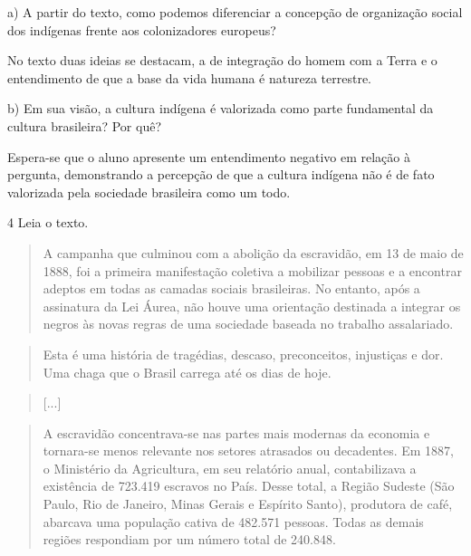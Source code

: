
a) A partir do texto, como podemos diferenciar a concepção de
organização social dos indígenas frente aos colonizadores europeus?

No texto duas ideias se destacam, a de integração do homem com a Terra e
o entendimento de que a base da vida humana é natureza terrestre.

b) Em sua visão, a cultura indígena é valorizada como parte fundamental
da cultura brasileira? Por quê?

Espera-se que o aluno apresente um entendimento negativo em relação à
pergunta, demonstrando a percepção de que a cultura indígena não é de
fato valorizada pela sociedade brasileira como um todo.

\num{4} Leia o texto.

\begin{quote}
A campanha que culminou com a abolição da escravidão, em 13 de maio de
1888, foi a primeira manifestação coletiva a mobilizar pessoas e a
encontrar adeptos em todas as camadas sociais brasileiras. No entanto,
após a assinatura da Lei Áurea, não houve uma orientação destinada a
integrar os negros às novas regras de uma sociedade baseada no trabalho
assalariado.
\end{quote}

\begin{quote}
Esta é uma história de tragédias, descaso, preconceitos, injustiças e
dor. Uma chaga que o Brasil carrega até os dias de hoje.
\end{quote}

\begin{quote}
{[}...{]}
\end{quote}

\begin{quote}
A escravidão concentrava-se nas partes mais modernas da economia e
tornara-se menos relevante nos setores atrasados ou decadentes. Em 1887,
o Ministério da Agricultura, em seu relatório anual, contabilizava a
existência de 723.419 escravos no País. Desse total, a Região Sudeste
(São Paulo, Rio de Janeiro, Minas Gerais e Espírito Santo), produtora de
café, abarcava uma população cativa de 482.571 pessoas. Todas as demais
regiões respondiam por um número total de 240.848.
\end{quote}

